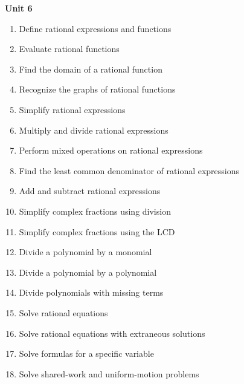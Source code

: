 \documentclass[11pt]{article}
\newenvironment{alphalist}{
\begin{enumerate}[label=(\arabic*),widest=107 ,leftmargin=25pt, itemsep=0pt]}
{\end{enumerate}}
\begin{document}
\noindent \textbf{Unit 6}
\begin{alphalist}
    \item Define rational expressions and functions
    \item Evaluate rational functions
    \item Find the domain of a rational function
    \item Recognize the graphs of rational functions
    \item Simplify rational expressions
    \item Multiply and divide rational expressions
    \item Perform mixed operations on rational expressions
    \item Find the least common denominator of rational expressions
    \item Add and subtract rational expressions
    \item Simplify complex fractions using division
    \item Simplify complex fractions using the LCD
    \item Divide a polynomial by a monomial
    \item Divide a polynomial by a polynomial
    \item Divide polynomials with missing terms 
    \item Solve rational equations
    \item Solve rational equations with extraneous solutions
    \item Solve formulas for a specific variable
    \item Solve shared-work and uniform-motion problems
\end{alphalist}
\end{document}
